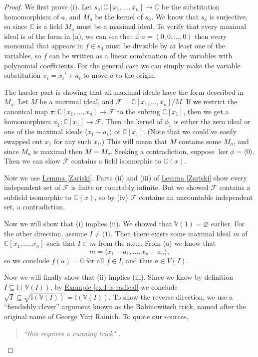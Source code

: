 \documentclass[letterpaper]{article}
\theoremstyle{definition}
\theoremstyle{remark}
\newcommand\CC{\mathbb{C}}
\newcommand\VV{\mathbb{V}}
\newcommand\II{\mathbb{I}}
\begin{document}
\begin{proof}
    We first prove (i). Let \(s_a:\CC[x_1,\dots,x_n]\to \CC\) be the substitution homomorphism of \(a\), and \(M_a\) be the kernel of \(s_a\). We know that \(s_a\) is surjective, so since \(\CC{}\) is a field \(M_a\) must be a maximal ideal. To verify that every maximal ideal is of the form in (a), we can see that if \(a=(0,0,\dots,0)\) then every monomial that appears in \(f\in s_0\) must be divisible by at least one of the variables, so \(f\) can be written as a linear combination of the variables with polynomial coefficients. For the general case we can simply make the variable substitution \(x_i=x_i'+a_i\) to move \(a\) to the origin. 
		
	The harder part is showing that all maximal ideals have the form described in \(M_a\). Let \(M\) be a maximal ideal, and \(\mathcal F=\CC[x_1,\dots,x_n]/M\). If we restrict the canonical map \(\pi:\CC[x_1,\dots,x_n]\to \mathcal F\) to the subring \(\CC[x_1]\), then we get a homomorphism \(\phi_1:\CC[x_1]\to\mathcal F\). Then the kernel of \(\phi_1\) is either the zero ideal or one of the maximal ideals \(\langle x_1-a_1\rangle\) of \(\CC[x_1]\). (Note that we could've easily swapped out \(x_1\) for any such \(x_i\).) This will mean that \(M\) contains some \(M_a\), and since \(M_a\) is maximal then \(M=M_a\). Seeking a contradiction, suppose \(\ker\phi=\langle 0\rangle\). Then we can show \(\mathcal F\) contains a field isomorphic to \(\CC(x)\). 
	
	Now we use \hyperref[Zariski]{Lemma \ref*{Zariski}}. Parts (ii) and (iii) of \hyperref[Zariski]{Lemma \ref*{Zariski}} show every independent set of \(\mathcal F\) is finite or countably infinite. But we showed \(\mathcal F\) contains a subfield isomorphic to \(\CC(x)\), so by (iv) \(\mathcal F\) contains an uncountable independent set, a contradiction. 
		
	Now we will show that (i) implies (ii). We showed that \(\VV(1)=\varnothing\) earlier. For the other direction, assume \(I\neq \langle 1\rangle\). Then there exists some maximal ideal \(m\) of \(\CC[x_1,\dots,x_n]\) such that \(I\subset m\) from the a.c.c. From (a) we know that \[m=\langle x_1-a_1,\dots,x_n-a_n\rangle,\] so we conclude \(f(a)=0\) for all \(f\in I\), and thus \(a\in V(I)\). 

	Now we will finally show that (ii) implies (iii). Since we know by definition \(I\subseteq\II(\VV(I))\), by \hyperref[ex:I-is-radical]{Example \ref*{ex:I-is-radical}} we conclude \(\sqrt I\subseteq \sqrt{ \II(\VV(I))}=\II(\VV(I))\). To show the reverse direction, we use a ``fiendishly clever'' argument known as the Rabinowitsch trick, named after the original name of George Yuri Rainich. To quote our sources, 
	\begin{quote}
		\textit{``this requires a cunning trick" \cite{reid}.}
		

\end{quote}
\end{proof}
\end{document}
